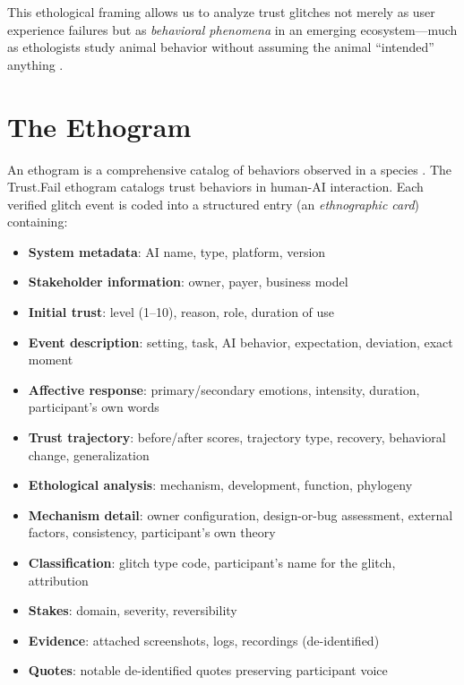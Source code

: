 \documentclass[11pt,a4paper]{article}
\begin{document}
This ethological framing allows us to analyze trust glitches not merely as user experience failures but as \textit{behavioral phenomena} in an emerging ecosystem---much as ethologists study animal behavior without assuming the animal ``intended'' anything \citep{lorenz1937companions, tinbergen1963aims}.

\section{The Ethogram}

An ethogram is a comprehensive catalog of behaviors observed in a species \citep{martin2007measuring}. The Trust.Fail ethogram catalogs trust behaviors in human-AI interaction. Each verified glitch event is coded into a structured entry (an \textit{ethnographic card}) containing:

\begin{itemize}[noitemsep]
    \item \textbf{System metadata}: AI name, type, platform, version
    \item \textbf{Stakeholder information}: owner, payer, business model
    \item \textbf{Initial trust}: level (1--10), reason, role, duration of use
    \item \textbf{Event description}: setting, task, AI behavior, expectation, deviation, exact moment
    \item \textbf{Affective response}: primary/secondary emotions, intensity, duration, participant's own words
    \item \textbf{Trust trajectory}: before/after scores, trajectory type, recovery, behavioral change, generalization
    \item \textbf{Ethological analysis}: mechanism, development, function, phylogeny
    \item \textbf{Mechanism detail}: owner configuration, design-or-bug assessment, external factors, consistency, participant's own theory
    \item \textbf{Classification}: glitch type code, participant's name for the glitch, attribution
    \item \textbf{Stakes}: domain, severity, reversibility
    \item \textbf{Evidence}: attached screenshots, logs, recordings (de-identified)
    \item \textbf{Quotes}: notable de-identified quotes preserving participant voice
\end{itemize}
\end{document}
